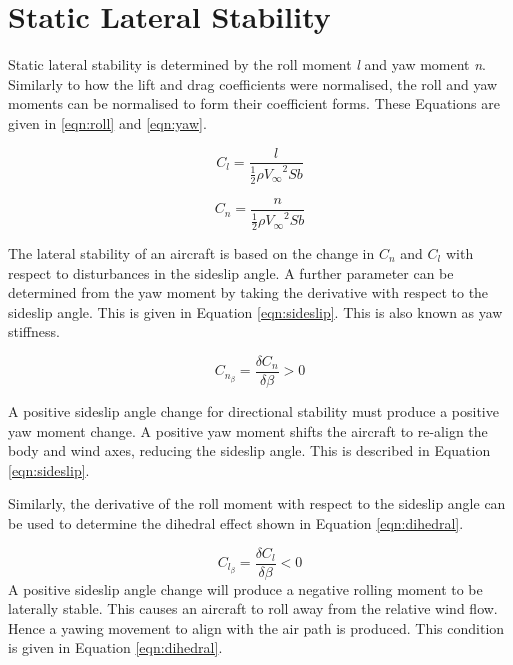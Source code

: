 \section{Static Lateral Stability}

Static lateral stability is determined by the roll moment \textit{l} and yaw moment \textit{n}. Similarly to how the lift and drag coefficients were normalised, the roll and yaw moments can be normalised to form their coefficient forms. These Equations are given in \ref{eqn:roll} and \ref{eqn:yaw}. 

\begin{equation}
    C_l = \frac{l}{\frac{1}{2} \rho {V_\infty}^2 S b }
    \label{eqn:roll}
\end{equation}

\begin{equation}
    C_n = \frac{n}{\frac{1}{2} \rho {V_\infty}^2 S b }
    \label{eqn:yaw}
\end{equation}

The lateral stability of an aircraft is based on the change in $C_n$ and $C_l$ with respect to disturbances in the sideslip angle. A further parameter can be determined from the yaw moment by taking the derivative with respect to the sideslip angle. This is given in Equation \ref{eqn:sideslip}. This is also known as yaw stiffness.

\begin{equation}
    C_{n_\beta} = \frac{\delta C_n}{\delta \beta} > 0
    \label{eqn:sideslip}
\end{equation}


A positive sideslip angle change for directional stability must produce a positive yaw moment change. A positive yaw moment shifts the aircraft to re-align the body and wind axes, reducing the sideslip angle. This is described in Equation \ref{eqn:sideslip}. 

Similarly, the derivative of the roll moment with respect to the sideslip angle can be used to determine the dihedral effect shown in Equation \ref{eqn:dihedral}.

\begin{equation}
    C_{l_\beta} = \frac{\delta C_l}{\delta \beta} < 0
    \label{eqn:dihedral}
\end{equation}
A positive sideslip angle change will produce a negative rolling moment to be laterally stable. This causes an aircraft to roll away from the relative wind flow. Hence a yawing movement to align with the air path is produced. This condition is given in Equation \ref{eqn:dihedral}. 

